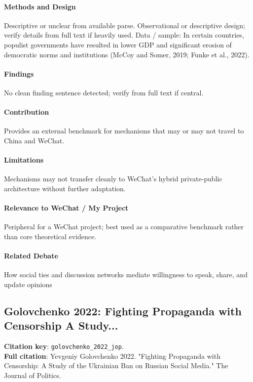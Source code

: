 \documentclass[12pt]{article}
\begin{document}
\paragraph{Methods and Design} Descriptive or unclear from available parse. Observational or descriptive design; verify details from full text if heavily used. Data / sample: In certain countries, populist governments have resulted in lower GDP and significant erosion of democratic norms and institutions (McCoy and Somer, 2019; Funke et al., 2022).

\paragraph{Findings} No clean finding sentence detected; verify from full text if central.

\paragraph{Contribution} Provides an external benchmark for mechanisms that may or may not travel to China and WeChat.

\paragraph{Limitations} Mechanisms may not transfer cleanly to WeChat's hybrid private-public architecture without further adaptation.

\paragraph{Relevance to WeChat / My Project} Peripheral for a WeChat project; best used as a comparative benchmark rather than core theoretical evidence.

\paragraph{Related Debate} How social ties and discussion networks mediate willingness to speak, share, and update opinions


\subsection{Golovchenko 2022: Fighting Propaganda with Censorship A Study...}
\textbf{Citation key}: \texttt{golovchenko\_2022\_jop}.\\
\textbf{Full citation}: Yevgeniy Golovchenko 2022. "Fighting Propaganda with Censorship: A Study of the Ukrainian Ban on Russian Social Media." The Journal of Politics.
\end{document}
